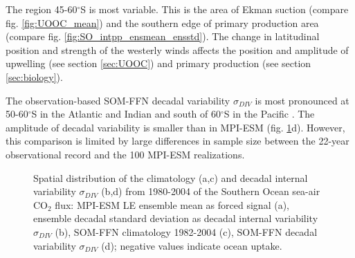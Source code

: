 The region 45-60$^\circ$S is most variable. This is the area of Ekman suction (compare fig. \ref{fig:UOOC_mean}) and the southern edge of primary production area (compare fig. \ref{fig:SO_intpp_ensmean_ensstd}). The change in latitudinal position and strength of the westerly winds affects the position and amplitude of upwelling (see section \ref{sec:UOOC}) and primary production (see section \ref{sec:biology}).\newline

The observation-based \acs{SOM-FFN} decadal variability $\sigma_{DIV}$ is most pronounced at 50-60$^\circ$S in the Atlantic and Indian and south of 60$^\circ$S in the Pacific \citep{Landschuetzer2016}. The amplitude of decadal variability is smaller than in \acs{MPI-ESM} (fig. \ref{fig:SOCS_ensmean_ensstd}d). However, this comparison is limited by large differences in sample size between the 22-year observational record and the 100 \acs{MPI-ESM} realizations.\newline %

\def\stackalignment{l}
\begin{figure}%
	\centering
	\caption{Spatial distribution of the climatology (a,c) and decadal internal variability $\sigma_{DIV}$ (b,d) from 1980-2004 of the Southern Ocean sea-air CO$_2$ flux: \acs{MPI-ESM LE} ensemble mean as forced signal (a), ensemble decadal standard deviation as decadal internal variability $\sigma_{DIV}$ (b), \acs{SOM-FFN} climatology 1982-2004 (c), \acs{SOM-FFN} decadal variability $\sigma_{DIV}$ (d); negative values indicate ocean uptake.}
	\label{fig:SOCS_ensmean_ensstd}
\end{figure}


